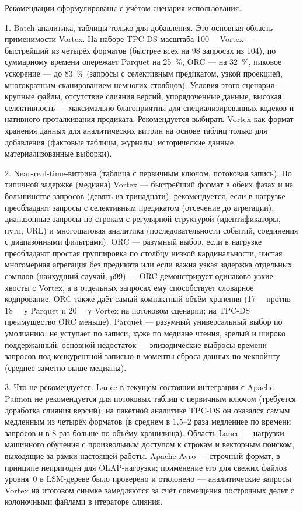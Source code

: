Рекомендации сформулированы с учётом сценария использования.

1. Batch-аналитика, таблицы только для добавления. Это основная
область применимости Vortex. На наборе TPC-DS масштаба \SI{100}{\giga\byte} Vortex
--- быстрейший из четырёх форматов (быстрее всех на \num{98} запросах из \num{104}),
по суммарному времени опережает Parquet на \SI{25}{\percent}, ORC --- на
\SI{32}{\percent}, пиковое ускорение --- до \SI{83}{\percent} (запросы с селективным
предикатом, узкой проекцией, многократным сканированием немногих столбцов). Условия
этого сценария --- крупные файлы, отсутствие слияния версий, упорядоченные данные,
высокая селективность --- максимально благоприятны для специализированных кодеков и
нативного проталкивания предиката. Рекомендуется выбирать Vortex как
формат хранения данных для аналитических витрин на основе таблиц только для
добавления (фактовые таблицы, журналы, исторические данные, материализованные
выборки).

2. Near-real-time-витрина (таблица с первичным ключом, потоковая запись).
По типичной задержке (медиана) Vortex --- быстрейший формат в обеих фазах
и на большинстве запросов (девять из тринадцати); рекомендуется, если в нагрузке
преобладают запросы с селективным предикатом (отсечение до агрегации), диапазонные
запросы по строкам с регулярной структурой (идентификаторы, пути, URL) и
многошаговая аналитика (последовательности событий, соединения с диапазонными
фильтрами). ORC --- разумный выбор, если в нагрузке преобладают простая
группировка по столбцу низкой кардинальности, чистая многомерная агрегация без
предиката или если важна узкая задержка отдельных сэмплов (наихудший случай, p99) ---
ORC демонстрирует одинаково узкие хвосты с Vortex, а в отдельных запросах ему
способствует словарное кодирование. ORC также даёт самый компактный объём хранения
(\SI{17}{\giga\byte} против \SI{18}{\giga\byte} у Parquet и \SI{20}{\giga\byte} у
Vortex на потоковом сценарии; на TPC-DS преимущество ORC меньше). Parquet
--- разумный универсальный выбор по умолчанию: не уступает по записи, хуже по
медиане чтения, зрелый и широко поддержанный; основной недостаток --- эпизодические
выбросы времени запросов под конкурентной записью в моменты сброса данных по
чекпойнту (среднее заметно выше медианы).

3. Что не рекомендуется. Lance в текущем состоянии интеграции с
Apache Paimon не рекомендуется для потоковых таблиц с первичным ключом (требуется
доработка слияния версий); на пакетной аналитике TPC-DS он оказался самым медленным
из четырёх форматов (в среднем в 1{,}5--2 раза медленнее по времени запросов и в
8 раз больше по объёму хранилища). Область Lance --- нагрузки машинного обучения с
произвольным доступом к строкам и векторным поиском, выходящие за рамки настоящей
работы. Apache Avro ---
строчный формат, в принципе непригоден для OLAP-нагрузки; применение его для
свежих файлов уровня~0 в LSM-дереве было проверено и отклонено --- аналитические
запросы Vortex на итоговом снимке замедляются за счёт совмещения построчных дельт
с колоночными файлами в итераторе слияния.

